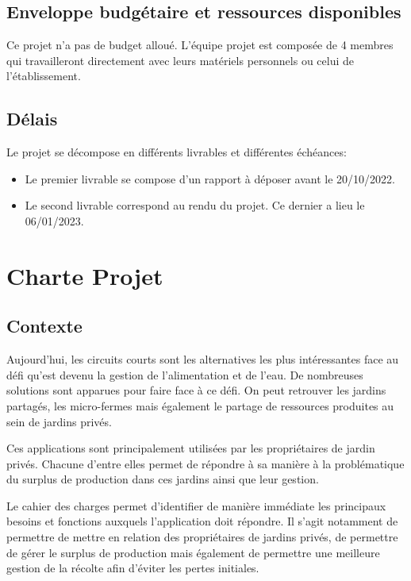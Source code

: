 \documentclass{article}
\begin{document}
\subsection{Enveloppe budgétaire et ressources disponibles}

Ce projet n'a pas de budget alloué. L'équipe projet est composée de 4 membres qui travailleront directement avec leurs matériels personnels ou celui de l'établissement.

\subsection{Délais}

Le projet se décompose en différents livrables et différentes échéances:
\begin{itemize}
    \item Le premier livrable se compose d'un rapport à déposer avant le 20/10/2022.
    \item Le second livrable correspond au rendu du projet. Ce dernier a lieu le 06/01/2023.
\end{itemize}

\vspace{8 mm}


\section{Charte Projet}

\subsection{Contexte}

Aujourd'hui, les circuits courts sont les alternatives les plus intéressantes face au défi qu'est devenu la gestion de l'alimentation et de l'eau. De nombreuses solutions sont apparues pour faire face à ce défi. On peut retrouver les jardins partagés, les micro-fermes mais également le partage de ressources produites au sein de jardins privés. 

Ces applications sont principalement utilisées par les propriétaires de jardin privés. Chacune d'entre elles permet de répondre à sa manière à la problématique du surplus de production dans ces jardins ainsi que leur gestion.

Le cahier des charges permet d'identifier de manière immédiate les principaux besoins et fonctions auxquels l'application doit répondre. Il s'agit notamment de permettre de mettre en relation des propriétaires de jardins privés, de permettre de gérer le surplus de production mais également de permettre une meilleure gestion de la récolte afin d'éviter les pertes initiales.
\end{document}

